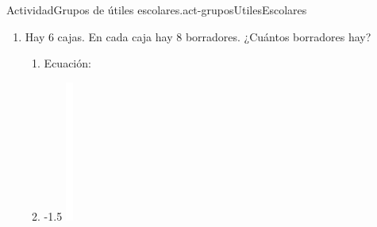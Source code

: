 \documentclass[14pt]{extarticle}
\begin{document}
\begin{activity}{Actividad}{Grupos de útiles escolares.}{act-gruposUtilesEscolares}
\begin{enumerate}
\begin{enumerate}
\begin{image}{0}{1}{0}{-1.5\baselineskip}
\end{image}%
%
\end{enumerate}
\clearpage
\item{}Hay 6 cajas. En cada caja hay 8 borradores. ¿Cuántos borradores hay?%
%
\begin{enumerate}
\item{}Ecuación:%
\item{}\begin{image}{0}{1}{0}{-1.5\baselineskip}%
\includegraphics[max width=\linewidth, center]{external/whitespace-tikz/3cm.pdf}

\end{image}
\end{enumerate}
\end{enumerate}
\end{activity}
\end{document}
